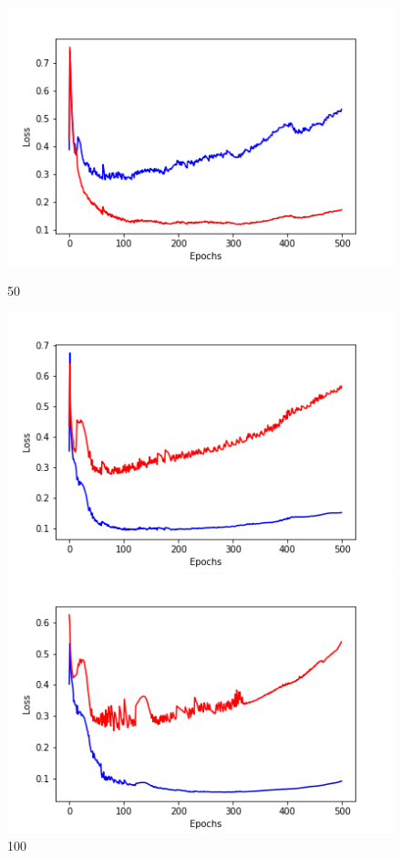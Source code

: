 \documentclass[20pt]{report}
\begin{document}
\begin{figure}[!htb]
  \includegraphics[width=\linewidth]{1_50.png}
	\caption{50}
\endminipage\hfill
{}
  \includegraphics[width=\linewidth]{1_100.png}
	\caption{100}
\endminipage\hfill
{}
  \includegraphics[width=\linewidth]{1_200.png}

\end{figure}
\end{document}
